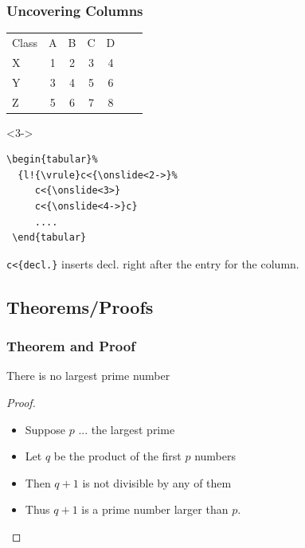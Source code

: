\documentclass{beamer}
\newcommand{\blue}[1]{\usebeamercolor[fg]{blue}#1}
\begin{document}
\begin{frame}[fragile]
  \frametitle{Uncovering Columns}

\begin{tabular}{l!{\vrule}c<{}c<{}c<{}c<{}c<{\onslide}c}
Class &	A &	 B &	 C &	 D\\
X &	1 &	 2 &	3 &	4\\
Y &	 3 &	 4 &	 5 &	6\\
Z &     5 &	6 &	7 &	8
\end{tabular}

  \begin{uncoverenv}<3->
  {{\begin{verbatim}
\begin{tabular}% 
  {l!{\vrule}c<{\onslide<2->}%
     c<{\onslide<3>}
     c<{\onslide<4->}c}
     ....
 \end{tabular}
  \end{verbatim}}}
  \end{uncoverenv}
\alert<4->{\texttt{\blue c<\{decl.\}} inserts decl. right after the entry for the column.}
\end{frame}


\subsection{Theorems/Proofs}

\begin{frame}
  \frametitle{Theorem and Proof}
	\begin{theorem}
 There is no largest prime number 
\end{theorem}

\begin{proof}
\begin{itemize}
\item Suppose $p$ ... the largest prime\pause
\item Let $q$ be the product of the first $p$ numbers\pause
\item Then $q+1$ is not divisible by any of them\pause
\item Thus $q+1$ is a prime number larger than $p$.\pause
\end{itemize}

\end{proof}
\end{frame}
\end{document}
